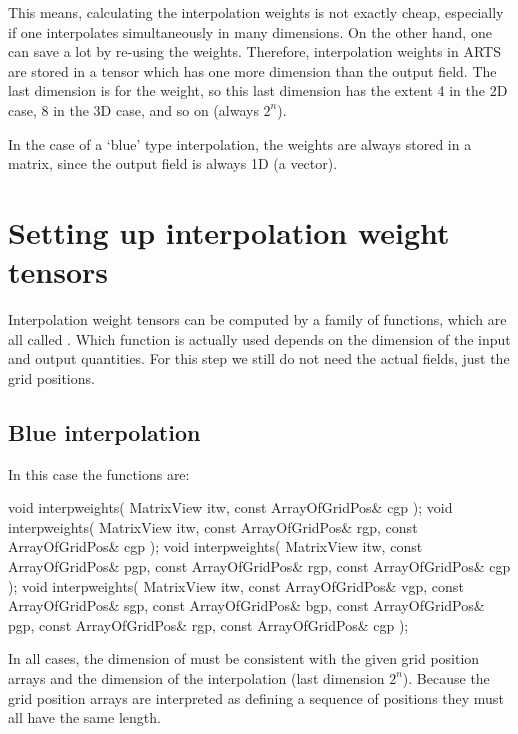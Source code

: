 This means, calculating the interpolation weights is not exactly
cheap, especially if one interpolates simultaneously in many
dimensions. On the other hand, one can save a lot by re-using the
weights.  Therefore, interpolation weights in ARTS are stored in a
tensor which has one more dimension than the output field. The last
dimension is for the weight, so this last dimension has the extent 4
in the 2D case, 8 in the 3D case, and so on (always $2^n$).

In the case of a `blue' type interpolation, the weights are
always stored in a matrix, since the output field is always 1D (a
vector). 

\section{Setting up interpolation weight tensors}

Interpolation weight tensors can be computed by a family of functions,
which are all called . Which function is actually
used depends on the dimension of the input and output quantities. For
this step we still do not need the actual fields, just the grid
positions.

\subsection{Blue interpolation}

In this case the functions are:

\begin{code}
void interpweights( MatrixView itw,
                    const ArrayOfGridPos& cgp );
void interpweights( MatrixView itw,
                    const ArrayOfGridPos& rgp,
                    const ArrayOfGridPos& cgp );
void interpweights( MatrixView itw,
                    const ArrayOfGridPos& pgp,
                    const ArrayOfGridPos& rgp,
                    const ArrayOfGridPos& cgp );
void interpweights( MatrixView itw,
                    const ArrayOfGridPos& vgp,
                    const ArrayOfGridPos& sgp,
                    const ArrayOfGridPos& bgp,
                    const ArrayOfGridPos& pgp,
                    const ArrayOfGridPos& rgp,
                    const ArrayOfGridPos& cgp );
\end{code}

In all cases, the dimension of  must be consistent with the
given grid position arrays and the dimension of the interpolation
(last dimension $2^n$). Because the grid position arrays are
interpreted as defining a sequence of positions they must all have
the same length.

